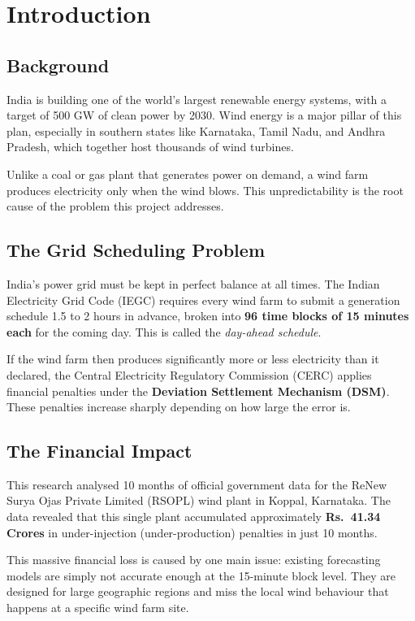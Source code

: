 \documentclass[12pt,a4paper]{report}
\begin{document}
\chapter{Introduction}

\section{Background}

India is building one of the world's largest renewable energy systems, with a target of 500 GW of clean power by 2030. Wind energy is a major pillar of this plan, especially in southern states like Karnataka, Tamil Nadu, and Andhra Pradesh, which together host thousands of wind turbines.

Unlike a coal or gas plant that generates power on demand, a wind farm produces electricity only when the wind blows. This unpredictability is the root cause of the problem this project addresses.

\section{The Grid Scheduling Problem}

India's power grid must be kept in perfect balance at all times. The Indian Electricity Grid Code (IEGC) requires every wind farm to submit a generation schedule 1.5 to 2 hours in advance, broken into \textbf{96 time blocks of 15 minutes each} for the coming day. This is called the \textit{day-ahead schedule}.

If the wind farm then produces significantly more or less electricity than it declared, the Central Electricity Regulatory Commission (CERC) applies financial penalties under the \textbf{Deviation Settlement Mechanism (DSM)}. These penalties increase sharply depending on how large the error is.

\section{The Financial Impact}

This research analysed 10 months of official government data for the ReNew Surya Ojas Private Limited (RSOPL) wind plant in Koppal, Karnataka. The data revealed that this single plant accumulated approximately \textbf{Rs.\ 41.34 Crores} in under-injection (under-production) penalties in just 10 months.

This massive financial loss is caused by one main issue: existing forecasting models are simply not accurate enough at the 15-minute block level. They are designed for large geographic regions and miss the local wind behaviour that happens at a specific wind farm site.
\end{document}
